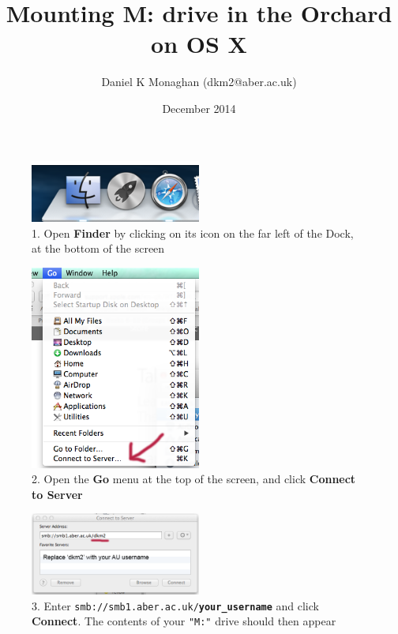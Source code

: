\documentclass[11pt]{article}
\title{Mounting M: drive in the Orchard on OS X}
\author{Daniel K Monaghan (dkm2@aber.ac.uk)}
\date{December 2014}
\begin{document}
\maketitle


\begin{figure}[H]
    \includegraphics[width=0.5\textwidth]{images/1.png}
    \caption*{1. Open \textbf{Finder} by clicking on its icon on the far left of the Dock, at the bottom of the screen}
\end{figure}

\begin{figure}[H]
    \includegraphics[width=0.5\textwidth]{images/2.png}
    \caption*{2. Open the \textbf{Go} menu at the top of the screen, and click \textbf{Connect to Server}}
\end{figure}

\begin{figure}[H]
    \includegraphics[width=0.5\textwidth]{images/3.png}
    \caption*{3. Enter \texttt{smb://smb1.aber.ac.uk/\textbf{your\_username}} and click \textbf{Connect}. The contents of your \texttt{"M:"} drive should then appear}
\end{figure}
\end{document}
